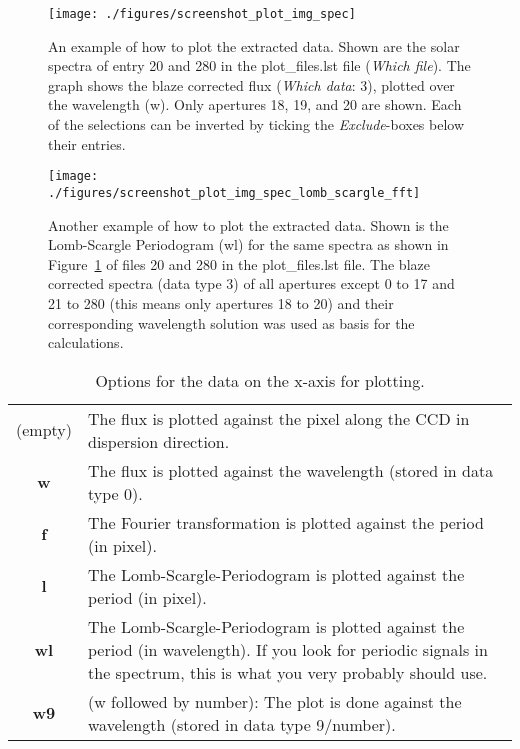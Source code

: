 \documentclass[10pt,a4paper]{article}
\begin{document}
\begin{figure} 
  \begin{center}
    \texttt{[image: ./figures/screenshot\_plot\_img\_spec]}
  \end{center} 
  \caption{An example of how to plot the extracted data. Shown are the solar spectra of entry 20 and 280 in the plot\_files.lst file (\textit{Which file}). The graph shows the blaze corrected flux (\textit{Which data}: 3), plotted over the wavelength (w). Only apertures 18, 19, and 20 are shown. Each of the selections can be inverted by ticking the \textit{Exclude}-boxes below their entries.
    \label{figure_plotting_results_example1}}
\end{figure}

\begin{figure} 
  \begin{center}
    \texttt{[image: ./figures/screenshot\_plot\_img\_spec\_lomb\_scargle\_fft]}
  \end{center} 
  \caption{Another example of how to plot the extracted data. Shown is the Lomb-Scargle Periodogram (wl) for the same spectra as shown in Figure~\ref{figure_plotting_results_example1} of files 20 and 280 in the plot\_files.lst file. The blaze corrected spectra (data type 3) of all apertures except 0 to 17 and 21 to 280 (this means only apertures 18 to 20) and their corresponding wavelength solution was used as basis for the calculations.
    \label{figure_plotting_results_example2}}
\end{figure}


\begin{table}[htb]
 \caption{Options for the data on the x-axis for plotting.\vspace{-0.9\baselineskip} }
 \label{Tab:plotting_options}
 \begin{tabularx}{\textwidth}{c X}
  (empty)    & The flux is plotted against the pixel along the CCD in dispersion direction.   \\
  \textbf{w} & The flux is plotted against the wavelength (stored in data type 0).   \\
  \textbf{f} & The Fourier transformation is plotted against the period (in pixel).    \\
  \textbf{l} & The Lomb-Scargle-Periodogram is plotted against the period (in pixel).   \\
  \textbf{wl} & The Lomb-Scargle-Periodogram is plotted against the period (in wavelength). If you look for periodic signals in the spectrum, this is what you very probably should use.    \\
  \textbf{w9} & (w followed by number): The plot is done against the wavelength (stored in data type 9/number).   \\
 \end{tabularx}
\end{table}
\end{document}
